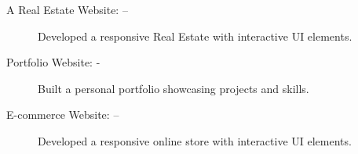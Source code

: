 \documentclass[12pt]{article}
\begin{document}
\begin{description}
    \item[A Real Estate Website: –] Developed a responsive Real Estate with interactive UI elements.
    \item[Portfolio Website: -] Built a personal portfolio showcasing projects and skills.
    \item[E-commerce Website: –] Developed a responsive online store with interactive UI elements.
\end{description}



\iffalse


\heading{Reference}
{\bf Declan Mackenzie}\\ 
{\em Recruitment Consultant}\\
SRS Partnership Limited\\
Pentagon Centre, 38 Washington Street, Glasgow, G3 8AZ, Room 122 (first floor)\\
\textcolor{orange}{\faPhone} 0141 212 1111\qquad
\textcolor{orange}{\faEnvelopeO} declan@srspartnership.com\\

 {\bf Ann Karomo}\\ 
 {\em Manager}\\
Serene HealthCare Services LTD\\
109 Stratton Road, SN1 2NY Swindon\\
\textcolor{orange}{\faPhone} +447389142266\qquad
\textcolor{orange}{\faEnvelopeO} info@sereneservices.co.uk\\

{\bf Miss Khadija}\\ 
{\em Manager}\\
KAEDI Recruitment Agency Ltd\\
Dancastle Court Unit 10, Arcadia Avenue, London, England, N3 2JU\\
\textcolor{orange}{\faPhone} +447376901434\qquad
\textcolor{orange}{\faEnvelopeO} khadija@kaedirecruitment.co.uk 
\fi
\end{document}
